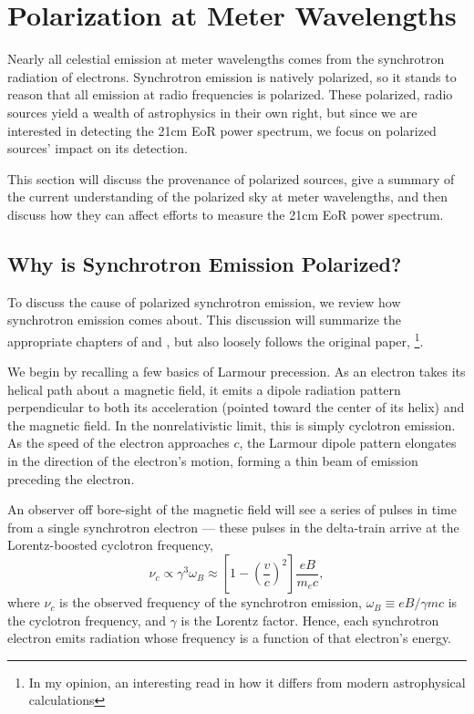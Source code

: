 \section{Polarization at Meter Wavelengths} \label{sec:FaradayRotation}

Nearly all celestial emission at meter wavelengths comes from the synchrotron radiation of
electrons. Synchrotron emission is natively polarized, so it stands to reason that all emission
at radio frequencies is polarized. These polarized, radio sources yield a wealth of astrophysics in
their own right, but since we are interested in detecting the 21cm EoR power spectrum, we focus on
polarized sources' impact on its detection.

This section will discuss the provenance of polarized sources, give a summary of the current
understanding of the polarized sky at meter wavelengths, and then discuss how they can affect
efforts to measure the 21cm EoR power spectrum.

\subsection{Why is Synchrotron Emission Polarized?}

To discuss the cause of polarized synchrotron emission, we review how synchrotron emission comes
about. This discussion will summarize the appropriate chapters of \citet{Tools} and
\citet{RybickiAndLightman}, but also loosely follows the original paper, \citet{Westfold1959}\footnote{
  In my opinion, an interesting read in how it differs from modern astrophysical calculations}. 

We begin by recalling a few basics of Larmour precession. As an electron takes its helical path
about a magnetic field, it emits a dipole radiation pattern perpendicular to both its acceleration
(pointed toward the center of its helix) and the magnetic field. In the nonrelativistic limit, this
is simply cyclotron emission.  As the speed of the electron approaches $c$, the Larmour dipole
pattern elongates in the direction of the electron's motion, forming a thin beam of emission
preceding the electron. 

An observer off bore-sight of the magnetic field will see a series of pulses in time from a single 
synchrotron electron --- these pulses in the delta-train arrive at the Lorentz-boosted cyclotron frequency, 
\begin{equation}
  \nu_c \propto \gamma^3\omega_B \approx \left[1-\left(\frac{v}{c}\right)^2\right] \frac{eB}{m_ec},
  \label{eq:synchrotron}
\end{equation}
where $\nu_c$ is the observed frequency of the synchrotron emission, $\omega_B \equiv eB/\gamma mc$
is the cyclotron frequency, and $\gamma$ is the Lorentz factor. Hence, each synchrotron electron
emits radiation whose frequency is a function of that electron's energy.

